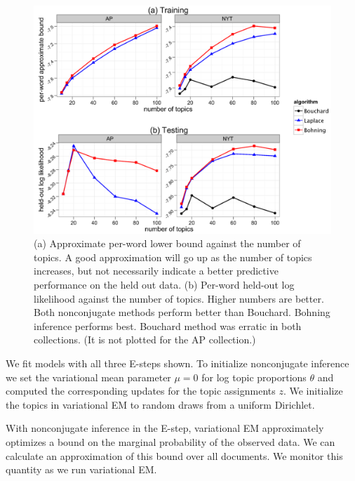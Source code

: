 \begin{figure}
  \centering
    \hspace*{-1.5cm}\includegraphics[height=0.40\textheight]{../Chap2/plots/figs/fig1-all-3.png}
  \caption{(a) Approximate per-word lower bound against the number of topics. A good approximation will go up as the number of topics increases, but not necessarily indicate a better predictive performance on the held out data. (b) Per-word held-out log likelihood against the number of topics. Higher numbers are better. Both nonconjugate methods perform better than Bouchard. Bohning inference performs best. Bouchard method was erratic in both collections. (It is not plotted for the AP collection.)}
  \label{fig:chap2-fig-all-3}
\end{figure}

We fit models with all three E-steps shown. To initialize nonconjugate inference we set the variational mean parameter $\mu = 0$ for log topic proportions $\theta$ and computed the corresponding updates for the topic assignments $z$. We initialize the topics in variational EM to random draws from a uniform Dirichlet.

With nonconjugate inference in the E-step, variational EM approximately optimizes a bound on the marginal probability of the observed data. We can calculate an approximation of this bound over all documents. We monitor this quantity as we run variational EM.

